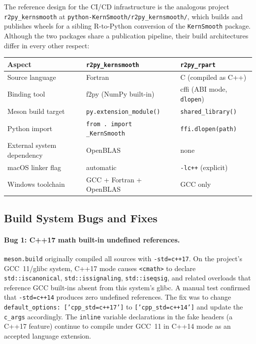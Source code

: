 \documentclass[12pt]{article}
\begin{document}
The reference design for the CI/CD infrastructure is the analogous project \texttt{r2py\_kernsmooth} at \texttt{python-KernSmooth/r2py\_kernsmooth/}, which builds and publishes wheels for a sibling R-to-Python conversion of the \texttt{KernSmooth} package. Although the two packages share a publication pipeline, their build architectures differ in every other respect:

\medskip
\begin{center}
\begin{tabular}{lll}
\toprule
Aspect & \texttt{r2py\_kernsmooth} & \texttt{r2py\_rpart} \\
\midrule
Source language & Fortran & C (compiled as C++) \\
Binding tool & f2py (NumPy built-in) & cffi (ABI mode, \texttt{dlopen}) \\
Meson build target & \texttt{py.extension\_module()} & \texttt{shared\_library()} \\
Python import & \texttt{from . import \_KernSmooth} & \texttt{ffi.dlopen(path)} \\
External system dependency & OpenBLAS & none \\
macOS linker flag & automatic & \texttt{-lc++} (explicit) \\
Windows toolchain & GCC + Fortran + OpenBLAS & GCC only \\
\bottomrule
\end{tabular}
\end{center}
\medskip

\subsection{Build System Bugs and Fixes}

\paragraph{Bug 1: C++17 math built-in undefined references.} \texttt{meson.build} originally compiled all sources with \texttt{-std=c++17}. On the project's GCC~11/glibc system, C++17 mode causes \texttt{<cmath>} to declare \texttt{std::iscanonical}, \texttt{std::issignaling}, \texttt{std::iseqsig}, and related overloads that reference GCC built-ins absent from this system's glibc. A manual test confirmed that \texttt{-std=c++14} produces zero undefined references. The fix was to change \texttt{default\_options: ['cpp\_std=c++17']} to \texttt{['cpp\_std=c++14']} and update the \texttt{c\_args} accordingly. The \texttt{inline} variable declarations in the fake headers (a C++17 feature) continue to compile under GCC~11 in C++14 mode as an accepted language extension.
\end{document}
